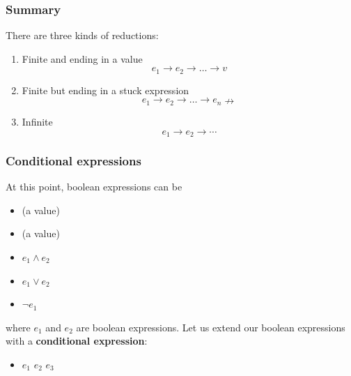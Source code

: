 %
\begin{frame}
\frametitle{Summary}

There are three kinds of reductions:
\begin{enumerate}

  \item Finite and ending in a value
  \[e_1 \rightarrow e_2 \rightarrow \dots \rightarrow v\]

  \item Finite but ending in a stuck expression
  \[e_1 \rightarrow e_2 \rightarrow \dots \rightarrow e_n
    \nrightarrow\]

  \item Infinite
  \[e_1 \rightarrow e_2 \rightarrow \cdots\]

\end{enumerate}

\end{frame}

%
\begin{frame}
\frametitle{Conditional expressions}

At this point, boolean expressions can be
\begin{itemize}

  \item \Xtrue (a value)

  \item \Xfalse (a value)

  \item \(e_1 \wedge e_2\)

  \item \(e_1 \vee e_2\)

  \item \(\neg e_1\)

\end{itemize}
where \(e_1\) and \(e_2\) are boolean expressions. Let us
extend our boolean expressions with a \textbf{conditional expression}:
\begin{itemize}
  \item \Xif \(e_1\) \Xthen \(e_2\) \Xelse \(e_3\)
\end{itemize}

\end{frame}

